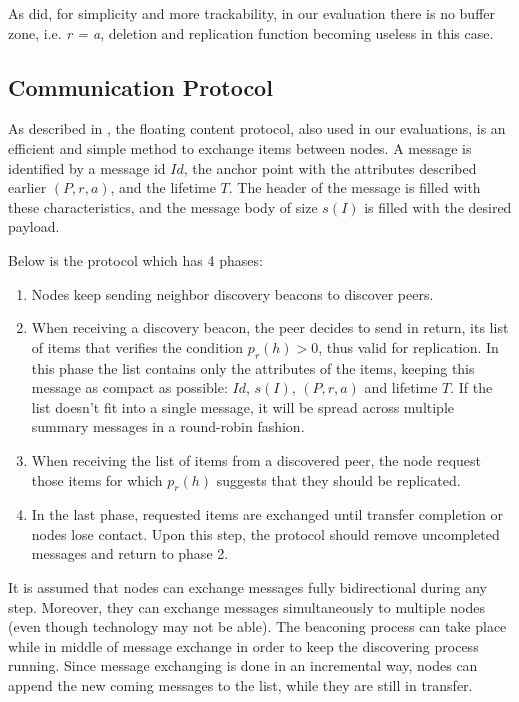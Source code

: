 As \cite{percomfloatingcontent} did, for simplicity and more trackability, in
our evaluation there is no buffer zone, i.e. {\it r = a}, deletion and replication
function becoming useless in this case.

\subsection{Communication Protocol}

As described in \cite{percomfloatingcontent}, the floating content protocol,
also used in our evaluations, is an efficient and simple method to exchange
items between nodes. A message is identified by a message id $Id$, the anchor point
with the attributes described earlier $(P, r, a)$, and the lifetime $T$. The
header of the message is filled with these characteristics, and the message body
of size $s(I)$ is filled with the desired payload.

Below is the protocol which has 4 phases:

\begin{enumerate}[1.]
  \item Nodes keep sending neighbor discovery beacons to discover peers.
  \item When receiving a discovery beacon, the peer decides to send in return,
  its list of items that verifies the condition $p_r(h) > 0$, thus valid for
  replication. In this phase the list contains only the attributes of the items,
  keeping this message as compact as possible: $Id$, $s(I)$, $(P, r, a)$ and
  lifetime $T$. If the list doesn't fit into a single message, it will be spread
  across multiple summary messages in a round-robin fashion.
  \item When receiving the list of items from a discovered peer, the node
  request those items for which $p_r(h)$ suggests that they should be replicated.
  \item In the last phase, requested items are exchanged until transfer
  completion or nodes lose contact. Upon this step, the protocol should remove
  uncompleted messages and return to phase 2.
\end{enumerate}

It is assumed that nodes can exchange messages fully bidirectional during any
step. Moreover, they can exchange messages simultaneously to multiple nodes
(even though technology may not be able). The beaconing process can take place
while in middle of message exchange in order to keep the discovering process
running. Since message exchanging is done in an incremental way, nodes can
append the new coming messages to the list, while they are still in transfer.

